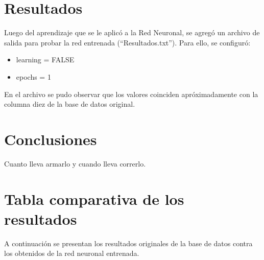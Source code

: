 \documentclass[12pt,titlepage]{article}
\begin{document}
\section{Resultados}
Luego del aprendizaje que se le aplic\'o a la Red Neuronal, se agreg\'o un archivo de salida para probar la red entrenada (``Resultados.txt''). Para ello, se configur\'o: 
\begin{itemize}
 \item learning = FALSE
 \item epochs = 1
\end{itemize}
En el archivo se pudo observar que los valores coinciden apr\'oximadamente con la columna diez de la base de datos original. 

\section{Conclusiones}
Cuanto lleva armarlo y cuando lleva correrlo. \\


\appendix
\newpage
\section{Tabla comparativa de los resultados}
A continuaci\'on se presentan los resultados originales de la base de datos contra los obtenidos de la red neuronal entrenada.

\end{document}
